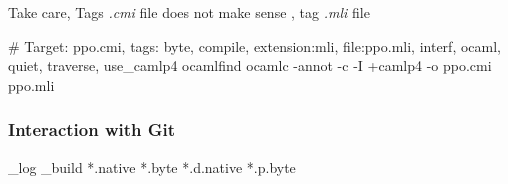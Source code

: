 Take care, Tags \textit{.cmi} file does not make sense , tag \textit{.mli} file


\begin{bashcode}
# Target: ppo.cmi, tags: { byte, compile, extension:mli, file:ppo.mli, interf, ocaml, quiet, traverse, use_camlp4 }
ocamlfind ocamlc -annot -c -I +camlp4 -o ppo.cmi ppo.mli
\end{bashcode}


\subsubsection{Interaction with Git}
\begin{bashcode}
_log
_build
*.native
*.byte
*.d.native
*.p.byte  
\end{bashcode}

